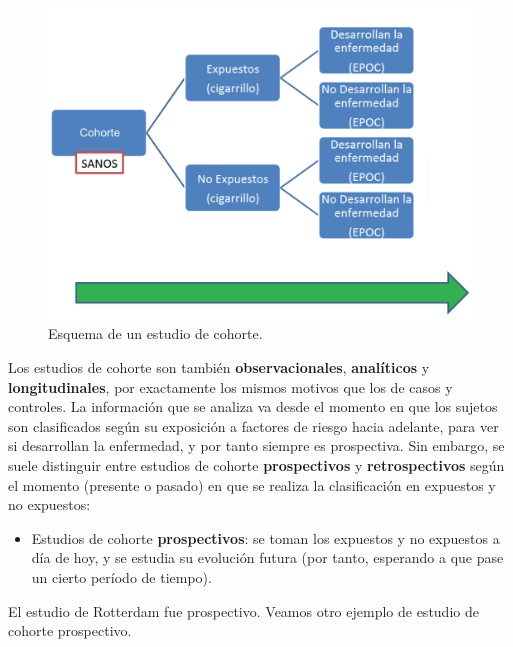 \documentclass[
]{book}
\providecommand{\tightlist}{%
  \setlength{\itemsep}{0pt}\setlength{\parskip}{0pt}}
\theoremstyle{definition}
\theoremstyle{definition}
\theoremstyle{definition}
\theoremstyle{definition}
\theoremstyle{remark}
\begin{document}
\begin{figure}

{\centering \includegraphics[width=0.8\linewidth]{INREMDN_files/figure-html/epoc} 

}

\caption{Esquema de un estudio de cohorte.}\label{fig:epoc}
\end{figure}

Los estudios de cohorte son también \textbf{observacionales}, \textbf{analíticos} y \textbf{longitudinales}, por exactamente los mismos motivos que los de casos y controles. La información que se analiza va desde el momento en que los sujetos son clasificados según su exposición a factores de riesgo hacia adelante, para ver si desarrollan la enfermedad, y por tanto siempre es prospectiva. Sin embargo, se suele distinguir entre estudios de cohorte \textbf{prospectivos} y \textbf{retrospectivos} según el momento (presente o pasado) en que se realiza la clasificación en expuestos y no expuestos:

\begin{itemize}
\tightlist
\item
  Estudios de cohorte \textbf{prospectivos}: se toman los expuestos y no expuestos a día de hoy, y se estudia su evolución futura (por tanto, esperando a que pase un cierto período de tiempo).
\end{itemize}

El estudio de Rotterdam fue prospectivo. Veamos otro ejemplo de estudio de cohorte prospectivo.
\end{document}
